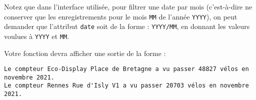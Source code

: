 \documentclass[11pt,a4paper]{article}
\begin{document}
Notez que dans l'interface utilisée, pour filtrer une date par mois 
(c'est-à-dire ne conserver que les enregistrements pour le mois \verb+MM+ de l'année 
\verb+YYYY+), on peut demander que l'attribut \verb+date+ soit de la forme : \verb+YYYY/MM+,
en donnant les valeurs voulues à \verb+YYYY+ et \verb+MM+.

Votre fonction devra afficher une sortie de la forme :

\begin{verbatim}
Le compteur Eco-Display Place de Bretagne a vu passer 48827 vélos en novembre 2021.
Le compteur Rennes Rue d'Isly V1 a vu passer 20703 vélos en novembre 2021.
\end{verbatim}
\end{document}
